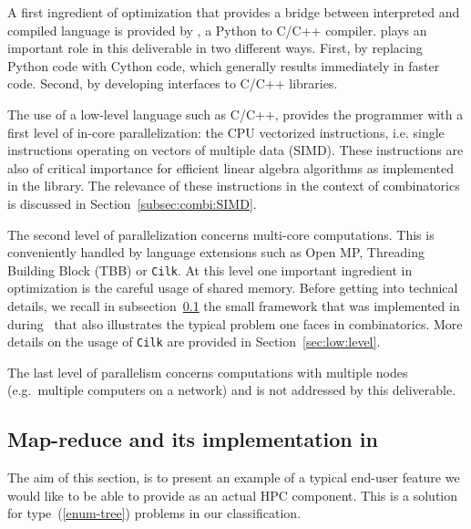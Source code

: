 \documentclass{deliverablereport}
\newcommand{\Cilk}{\texttt{Cilk}\xspace}
\begin{document}
A first ingredient of optimization that provides a bridge between interpreted
and compiled language is provided by \Cython, a Python
to C/C++ compiler. \Cython plays an important role in this deliverable in two
different ways. First, by replacing Python code with Cython code, which generally results
immediately in faster code. Second, by developing interfaces to C/C++ libraries.

The use of a low-level language such as C/C++, provides the programmer with a
first level of in-core
parallelization: the CPU vectorized
instructions, i.e. single instructions operating on vectors of multiple
data (SIMD). These instructions are also of critical importance for efficient
linear algebra algorithms as implemented in the \Linbox library. The relevance
of these instructions in the context of combinatorics is discussed in
Section~\ref{subsec:combi:SIMD}. 

The second level of parallelization concerns multi-core computations. This is
conveniently handled by language extensions such as Open MP, Threading 
Building Block (TBB) or \Cilk. At this level one important ingredient in
optimization is the careful usage of shared memory.  Before getting into
technical details, we recall in subsection~\ref{subsec:map-reduce:Sage} the
small framework that was implemented in \Sage
during~ that also illustrates the typical
problem one faces in combinatorics. More details on the usage of \Cilk are
provided in Section~\ref{sec:low:level}.

The last level of parallelism concerns computations with multiple nodes
(e.g.~multiple computers on a network) and is not addressed by this
deliverable.

\subsection{Map-reduce and its implementation in \Sage}
\label{subsec:map-reduce:Sage}

The aim of this section, is to present an example of a typical end-user feature we would like
to be able to provide as an actual HPC component. This is a solution for
type~(\ref{enum-tree}) problems in our classification.
\end{document}
